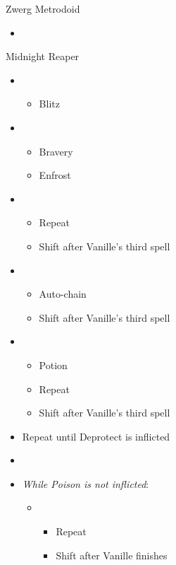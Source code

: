 \documentclass{report}
\begin{document}
\begin{battle}{Zwerg Metrodoid}
\begin{itemize}
   \item {}
\end{itemize}
\end{battle}
\begin{battle}{Midnight Reaper}
\begin{itemize}
    \item \first
    \begin{itemize}
        \item Blitz
    \end{itemize}
    \item \third
    \begin{itemize}
        \item Bravery
        \item Enfrost
    \end{itemize}
    \item \sixth
    \begin{itemize}
        \item Repeat
        \item Shift after Vanille's third spell
    \end{itemize}
    \item \fifth
    \begin{itemize}
        \item Auto-chain
        \item Shift after Vanille's third spell
    \end{itemize}
    \item \sixth
    \begin{itemize}
        \item Potion
        \item Repeat
        \item Shift after Vanille's third spell
    \end{itemize}
    \item Repeat until Deprotect is inflicted
    \item \stagger
    \item \textit{While Poison is not inflicted}:
    \begin{itemize}
        \item \first
        \begin{itemize}
            \item Repeat
            \item Shift after Vanille finishes

\end{itemize}
\end{itemize}
\end{itemize}
\end{battle}
\end{document}
